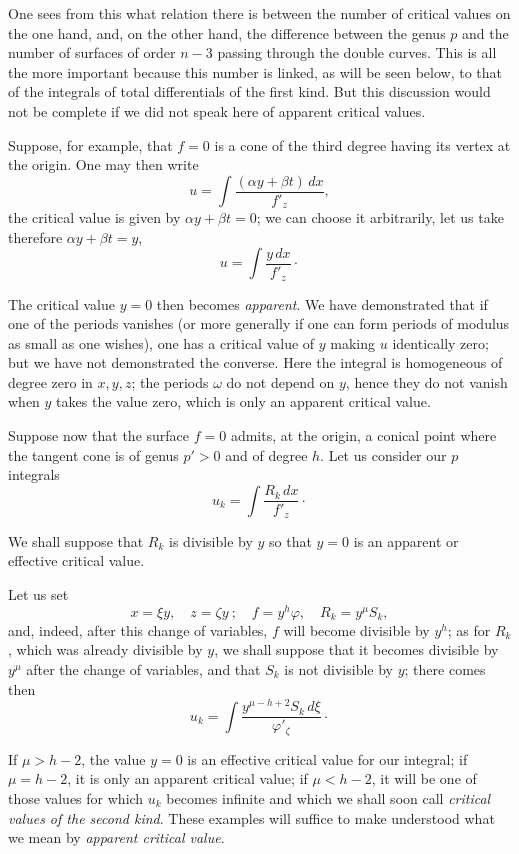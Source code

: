 \documentclass{article}
\begin{document}
One sees from this what relation there is between the number of critical
values on the one hand, and, on the other hand, the difference between the genus $p$ and the number of surfaces of order $n - 3$ passing through the double curves. This is all the more important because this number is linked, as will be seen below, to that of the integrals of total differentials of the first kind. But this discussion would not be complete if we did not speak here of apparent critical values.

Suppose, for example, that $f = 0$ is a cone of the third degree having its vertex at the origin. One may then write
\[
u = \int \frac{(\alpha y + \beta t) \,dx}{f'_{z}},
\]
the critical value is given by $\alpha y + \beta t = 0$; we can choose it arbitrarily, let us take therefore $\alpha y + \beta t = y$,
\[
u = \int \frac{y \,dx}{f'_{z}} \cdot
\]

The critical value $y = 0$ then becomes \emph{apparent}. We have demonstrated that if one of the periods vanishes (or more generally if one can form periods of modulus as small as one wishes), one has a critical value of $y$ making $u$ identically zero; but we have not demonstrated the converse. Here the integral is homogeneous of degree zero in $x, y, z$; the periods $\omega$ do not depend on $y$, hence they do not vanish when $y$ takes the value zero, which is only an apparent critical value.

Suppose now that the surface $f = 0$ admits, at the origin, a conical point where the tangent cone is of genus $p' > 0$ and of degree $h$. Let us consider our $p$ integrals
\[
u_{k} = \int \frac{R_{k} \,dx}{f'_{z}} \cdot
\]

We shall suppose that $R_{k}$ is divisible by $y$ so that $y = 0$ is an apparent or effective critical value.

Let us set
\[
x = \xi y, \quad z = \zeta y~; \quad f = y^{h} \varphi, \quad R_{k} = y^{\mu} S_{k},
\]
and, indeed, after this change of variables, $f$ will become divisible
by $y^{h}$; as for $R_{k}$, which was already divisible by $y$, we shall suppose that it becomes divisible by $y^{\mu}$ after the change of variables, and that $S_{k}$ is not divisible by $y$; there comes then
\[
u_{k} = \int \frac{y^{\mu - h + 2} S_{k} \,d\xi}{\varphi'_{\zeta}} \cdot
\]

If $\mu > h - 2$, the value $y = 0$ is an effective critical value for our integral; if $\mu = h - 2$, it is only an apparent critical value; if $\mu < h - 2$, it will be one of those values for which $u_{k}$ becomes infinite and which we shall soon call \emph{critical values of the second kind}. These examples will suffice to make understood what we mean by \emph{apparent critical value}.
\end{document}
